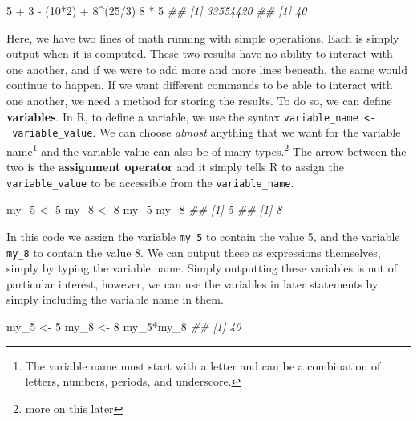 \documentclass[
  letterpaper,
  DIV=11,
  numbers=noendperiod]{scrreprt}
\newenvironment{Shaded}{\begin{snugshade}}{\end{snugshade}}
\newcommand{\DecValTok}[1]{\textcolor[rgb]{0.68,0.00,0.00}{#1}}
\newcommand{\DocumentationTok}[1]{\textcolor[rgb]{0.37,0.37,0.37}{\textit{#1}}}
\newcommand{\NormalTok}[1]{\textcolor[rgb]{0.00,0.23,0.31}{#1}}
\newcommand{\OtherTok}[1]{\textcolor[rgb]{0.00,0.23,0.31}{#1}}
\newcommand{\SpecialCharTok}[1]{\textcolor[rgb]{0.37,0.37,0.37}{#1}}
\theoremstyle{definition}
\theoremstyle{definition}
\theoremstyle{definition}
\theoremstyle{remark}
\begin{document}
\begin{Shaded}
\begin{Highlighting}[]
\DecValTok{5} \SpecialCharTok{+} \DecValTok{3} \SpecialCharTok{{-}}\NormalTok{ (}\DecValTok{10}\SpecialCharTok{*}\DecValTok{2}\NormalTok{) }\SpecialCharTok{+} \DecValTok{8}\SpecialCharTok{\^{}}\NormalTok{(}\DecValTok{25}\SpecialCharTok{/}\DecValTok{3}\NormalTok{)}
\DecValTok{8} \SpecialCharTok{*} \DecValTok{5}
\DocumentationTok{\#\# [1] 33554420}
\DocumentationTok{\#\# [1] 40}
\end{Highlighting}
\end{Shaded}

Here, we have two lines of math running with simple operations. Each is
simply output when it is computed. These two results have no ability to
interact with one another, and if we were to add more and more lines
beneath, the same would continue to happen. If we want different
commands to be able to interact with one another, we need a method for
storing the results. To do so, we can define \textbf{variables}. In R,
to define a variable, we use the syntax
\texttt{variable\_name\ \textless{}-\ variable\_value}. We can choose
\emph{almost} anything that we want for the variable name\footnote{The
  variable name must start with a letter and can be a combination of
  letters, numbers, periods, and underscore.} and the variable value can
also be of many types.\footnote{more on this later} The arrow between
the two is the \textbf{assignment operator} and it simply tells R to
assign the \texttt{variable\_value} to be accessible from the
\texttt{variable\_name}.

\begin{Shaded}
\begin{Highlighting}[]
\NormalTok{my\_5 }\OtherTok{\textless{}{-}} \DecValTok{5}
\NormalTok{my\_8 }\OtherTok{\textless{}{-}} \DecValTok{8}
\NormalTok{my\_5}
\NormalTok{my\_8}
\DocumentationTok{\#\# [1] 5}
\DocumentationTok{\#\# [1] 8}
\end{Highlighting}
\end{Shaded}

In this code we assign the variable \texttt{my\_5} to contain the value
5, and the variable \texttt{my\_8} to contain the value 8. We can output
these as expressions themselves, simply by typing the variable name.
Simply outputting these variables is not of particular interest,
however, we can use the variables in later statements by simply
including the variable name in them.

\begin{Shaded}
\begin{Highlighting}[]
\NormalTok{my\_5 }\OtherTok{\textless{}{-}} \DecValTok{5}
\NormalTok{my\_8 }\OtherTok{\textless{}{-}} \DecValTok{8}
\NormalTok{my\_5}\SpecialCharTok{*}\NormalTok{my\_8}
\DocumentationTok{\#\# [1] 40}
\end{Highlighting}
\end{Shaded}
\end{document}
